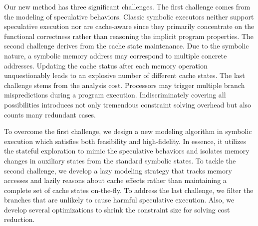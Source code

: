 \documentclass[sigconf]{acmart}
\newcommand\ignore[1]{}
\begin{document}
Our new method has three significant challenges. The first challenge comes from 
the modeling of speculative behaviors. Classic symbolic executors
\cite{CadarDE08,PasareanuR10} 
neither support speculative execution nor are cache-aware since they primarily 
concentrate on the functional correctness rather than reasoning the implicit 
program properties. 
%
The second challenge derives from the cache state maintenance. Due to the symbolic 
nature, a symbolic memory address may correspond to multiple concrete addresses. 
Updating the cache status after each memory operation unquestionably leads to an 
explosive number of different cache states. 
%
The last challenge stems from the analysis cost. Processors may trigger multiple 
branch mispredictions during a program execution. Indiscriminately covering all 
possibilities introduces not only tremendous constraint solving overhead but also 
counts many redundant cases. 


To overcome the first challenge, we design a new modeling algorithm in symbolic 
execution which satisfies both feasibility and high-fidelity. In essence, it 
utilizes the stateful exploration to mimic the speculative behaviors and isolates 
memory changes in auxiliary states from the standard symbolic states. 
%
To tackle the second challenge, we develop a lazy modeling strategy that tracks 
memory accesses and lazily reasons about cache effects rather than maintaining a 
complete set of cache states on-the-fly. 
%
To address the last challenge, we filter the branches that are unlikely to cause 
harmful speculative execution. Also, we develop several optimizations to shrink 
the constraint size for solving cost reduction.



\ignore{
Also, We develop a merging schema between the mimicked states and regular symbolic 
states to accumulate the cache side effects.

In general, we decompose the precise but lengthy constraint into smaller chunks 
without losing correctness, as well as utilizing executor kernel characteristics 
for faster computation.

However, the side effects caused by speculative execution are normally undetectable 
under standard symbolic execution. To overcome this problem, we introduce the 
$\mathit{speculative~modeling}$ into symbolic execution. Thus, cache side effects 
are visible and cache timing leaks from speculative execution detectable now. 
}
\end{document}
